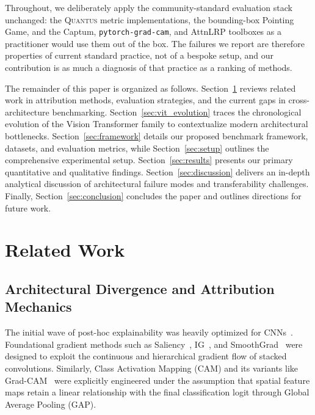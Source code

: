 \documentclass[final,5p,times,twocolumn]{elsarticle}
\begin{document}
Throughout, we deliberately apply the community-standard evaluation stack unchanged: the \textsc{Quantus} metric implementations, the bounding-box Pointing Game, and the Captum, \texttt{pytorch-grad-cam}, and AttnLRP toolboxes as a practitioner would use them out of the box. The failures we report are therefore properties of current standard practice, not of a bespoke setup, and our contribution is as much a diagnosis of that practice as a ranking of methods.

The remainder of this paper is organized as follows. Section~\ref{sec:related} reviews related work in attribution methods, evaluation strategies, and the current gaps in cross-architecture benchmarking. Section~\ref{sec:vit_evolution} traces the chronological evolution of the Vision Transformer family to contextualize modern architectural bottlenecks. Section~\ref{sec:framework} details our proposed benchmark framework, datasets, and evaluation metrics, while Section~\ref{sec:setup} outlines the comprehensive experimental setup. Section~\ref{sec:results} presents our primary quantitative and qualitative findings. Section~\ref{sec:discussion} delivers an in-depth analytical discussion of architectural failure modes and transferability challenges. Finally, Section~\ref{sec:conclusion} concludes the paper and outlines directions for future work.


\section{Related Work}
\label{sec:related}

\subsection{Architectural Divergence and Attribution Mechanics}
The initial wave of post-hoc explainability was heavily optimized for CNNs~\cite{zeiler2014occlusion,bach2015lrp}. Foundational gradient methods such as Saliency~\cite{simonyan2014saliency}, IG~\cite{sundararajan2017ig}, and SmoothGrad~\cite{smilkov2017smoothgrad} were designed to exploit the continuous and hierarchical gradient flow of stacked convolutions. Similarly, Class Activation Mapping (CAM) and its variants like Grad-CAM~\cite{selvaraju2017gradcam} were explicitly engineered under the assumption that spatial feature maps retain a linear relationship with the final classification logit through Global Average Pooling (GAP). 
\end{document}
